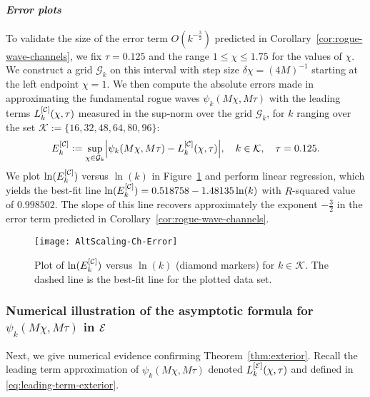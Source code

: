 \paragraph{\textit{Error plots}} To validate the size of the error term $O(k^{-\frac{3}{2}})$ predicted in Corollary~\ref{cor:rogue-wave-channels}, we fix $\tau=0.125$ and the range $1\leq \chi \leq 1.75$ for the values of $\chi$. We construct a grid $\mathcal{G}_k$ on this interval with step size
$\delta\chi = (4M)^{-1}$ starting at the left endpoint $\chi=1$. 
We then compute the absolute errors made in approximating the fundamental rogue waves $\psi_k(M\chi,M\tau)$ with the leading terms $L_k^{[\mathcal{C}]}(\chi,\tau)$ measured in the sup-norm over the grid $\mathcal{G}_k$, for $k$ ranging over the set $\mathcal{K} := \{16, 32, 48, 64, 80, 96 \}$:
\begin{equation}
E_k^{[\channels]}\defeq \sup_{\chi \in \mathcal{G}_k} \left| \psi_{k}(M\chi,M\tau) - L_k^{[\channels]}(\chi,\tau) \right|, \quad k\in\mathcal{K},\quad \tau=0.125.
\end{equation}
We plot $\ln(E_k^{[\mathcal{C}]})$ versus $\ln(k)$ in Figure~\ref{f:channels-errors} and perform linear regression, which yields the best-fit line $\ln(E_k^{[\mathcal{C}]}) =0.518758 - 1.48135 \ln(k)$ with $R$-squared value of $0.998502$. The slope of this line recovers approximately the exponent $-\tfrac{3}{2}$ in the error term predicted in Corollary~\ref{cor:rogue-wave-channels}.
\begin{figure}[h]
\texttt{[image: AltScaling-Ch-Error]}
\caption{Plot of $\ln(E_k^{[\mathcal{C}]})$ versus $\ln(k)$ (diamond markers) for $k\in\mathcal{K}$. The dashed line is the best-fit line for the plotted data set.}
\label{f:channels-errors}
\end{figure}



\subsubsection{Numerical illustration of the asymptotic formula for $\psi_k(M\chi,M\tau)$ in $\mathcal{E}$} 
Next, we give numerical evidence confirming Theorem~\ref{thm:exterior}.  Recall the leading term approximation of $\psi_k(M\chi,M\tau)$ denoted $L_k^{[\mathcal{E}]}(\chi,\tau)$ and defined in \eqref{eq:leading-term-exterior}.
%
